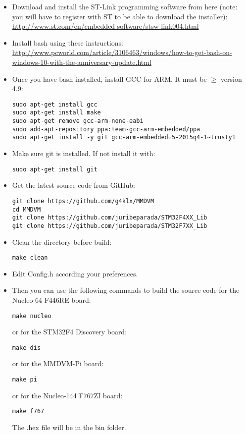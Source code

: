 \documentclass[]{article}
\begin{document}
\begin{itemize}[leftmargin=*]
	
\item Download and install the ST-Link programming software from here (note: you will have to register with ST to be able to download the installer): \url{http://www.st.com/en/embedded-software/stsw-link004.html}

\item Install bash using these instructions: \url{http://www.pcworld.com/article/3106463/windows/how-to-get-bash-on-windows-10-with-the-anniversary-update.html}

\item Once you have bash installed, install GCC for ARM. It must be $\geq$ version 4.9:
\begin{lstlisting}[style=DOS]
sudo apt-get install gcc
sudo apt-get install make
sudo apt-get remove gcc-arm-none-eabi
sudo add-apt-repository ppa:team-gcc-arm-embedded/ppa
sudo apt-get install -y git gcc-arm-embedded=5-2015q4-1~trusty1
\end{lstlisting}

\item Make sure git is installed. If not install it with:
\begin{lstlisting}[style=DOS]
sudo apt-get install git
\end{lstlisting}

\item Get the latest source code from GitHub:
\begin{lstlisting}[style=DOS]
git clone https://github.com/g4klx/MMDVM
cd MMDVM
git clone https://github.com/juribeparada/STM32F4XX_Lib
git clone https://github.com/juribeparada/STM32F7XX_Lib
\end{lstlisting}

\item Clean the directory before build:
\begin{lstlisting}[style=DOS]
make clean
\end{lstlisting}

\item Edit Config.h according your preferences.

\item Then you can use the following commands to build the source code for the Nucleo-64 F446RE board:
\begin{lstlisting}[style=DOS]
make nucleo
\end{lstlisting}

or for the STM32F4 Discovery board:
\begin{lstlisting}[style=DOS]
make dis
\end{lstlisting}

or for the MMDVM-Pi board:
\begin{lstlisting}[style=DOS]
make pi
\end{lstlisting}

or for the Nucleo-144 F767ZI board:
\begin{lstlisting}[style=DOS]
make f767
\end{lstlisting}

The .hex file will be in the bin folder.

\end{itemize}
\end{document}
